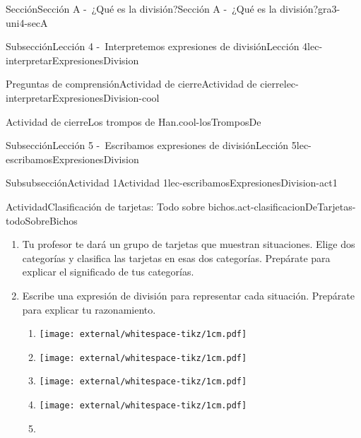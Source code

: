 \begin{sectionptx}{Sección}{Sección A -~¿Qué es la división?}{}{Sección A -~¿Qué es la división?}{}{}{gra3-uni4-secA}
\begin{subsectionptx}{Subsección}{Lección 4 -~Interpretemos expresiones de división}{}{Lección 4}{}{}{lec-interpretarExpresionesDivision}
\begin{reading-questions-subsubsection-numberless}{Preguntas de comprensión}{Actividad de cierre}{}{Actividad de cierre}{}{}{lec-interpretarExpresionesDivision-cool}
\begin{project}{Actividad de cierre}{Los trompos de Han.}{cool-losTromposDe}
\begin{sidebyside}{4}{0.0075}{0.0075}{0.015}
\begin{sbspanel}{0.43}
%
\end{sbspanel}%
\end{sidebyside}%
\end{project}%
\end{reading-questions-subsubsection-numberless}
\end{subsectionptx}
%
%
\typeout{************************************************}
\typeout{************************************************}
%
\begin{subsectionptx}{Subsección}{Lección 5 -~Escribamos expresiones de división}{}{Lección 5}{}{}{lec-escribamosExpresionesDivision}
%
%
\typeout{************************************************}
\typeout{************************************************}
%
\begin{subsubsectionptx}{Subsubsección}{Actividad 1}{}{Actividad 1}{}{}{lec-escribamosExpresionesDivision-act1}
\begin{activity}{Actividad}{Clasificación de tarjetas: Todo sobre bichos.}{act-clasificacionDeTarjetas-todoSobreBichos}%
%
\begin{enumerate}
\item{}Tu profesor te dará un grupo de tarjetas que muestran situaciones. Elige dos categorías y clasifica las tarjetas en esas dos categorías. Prepárate para explicar el significado de tus categorías.%
\item{}Escribe una expresión de división para representar cada situación. Prepárate para explicar tu razonamiento.%
%
\begin{enumerate}[label={\Alph*.}]
\item{}\begin{image}{0}{1}{0}{}%
\texttt{[image: external/whitespace-tikz/1cm.pdf]}
\end{image}%
%
\item{}\begin{image}{0}{1}{0}{}%
\texttt{[image: external/whitespace-tikz/1cm.pdf]}
\end{image}%
%
\item{}\begin{image}{0}{1}{0}{}%
\texttt{[image: external/whitespace-tikz/1cm.pdf]}
\end{image}%
%
\item{}\begin{image}{0}{1}{0}{}%
\texttt{[image: external/whitespace-tikz/1cm.pdf]}
\end{image}%
%
\item{}\begin{image}{0}{1}{0}{}%

\end{image}
\end{enumerate}
\end{enumerate}
\end{activity}
\end{subsubsectionptx}
\end{subsectionptx}
\end{sectionptx}
